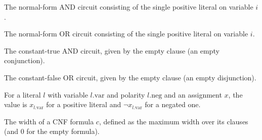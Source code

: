 \begin{definition}
\label{BoolCircuit.NAndCircuit.ofVar}
\leanok
{}
The normal-form AND circuit consisting of the single positive literal on variable $i$.
\end{definition}

\begin{definition}
\label{BoolCircuit.NOrCircuit.ofVar}
\leanok
{}
The normal-form OR circuit consisting of the single positive literal on variable $i$.
\end{definition}

\begin{definition}
\label{BoolCircuit.NAndCircuit.constTrue}
\leanok
{}
The constant-true AND circuit, given by the empty clause (an empty conjunction).
\end{definition}

\begin{definition}
\label{BoolCircuit.NOrCircuit.constFalse}
\leanok
{}
The constant-false OR circuit, given by the empty clause (an empty disjunction).
\end{definition}

\begin{definition}
\label{Literal.eval}
\leanok
{}
For a literal $l$ with variable $l.\mathrm{var}$ and polarity $l.\mathrm{neg}$ and an
assignment $x$, the value is $x_{l.\mathrm{var}}$ for a positive literal and
$\lnot x_{l.\mathrm{var}}$ for a negated one.
\end{definition}

\begin{definition}
\label{CNF.width}
\leanok
{}
The width of a CNF formula $c$, defined as the maximum width over its clauses (and $0$
for the empty formula).
\end{definition}

